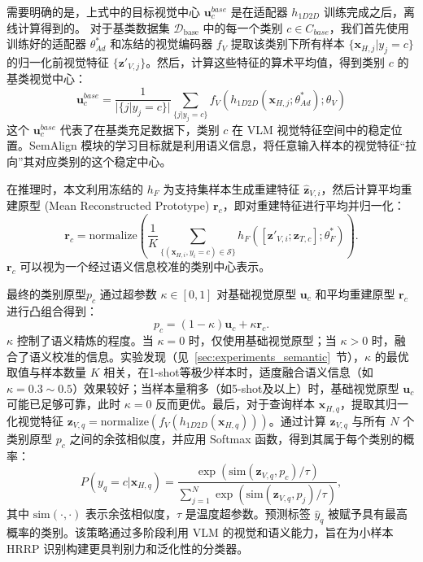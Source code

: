 需要明确的是，上式中的目标视觉中心 $\mathbf{u}_c^{base}$ 是在适配器 $h_{1D2D}$ 训练完成之后，离线计算得到的。 对于基类数据集 $\mathcal{D}_{\text{base}}$ 中的每一个类别 $c \in C_{base}$，我们首先使用训练好的适配器 $\theta_{Ad}^*$ 和冻结的视觉编码器 $f_V$ 提取该类别下所有样本 $\{\mathbf{x}_{H,j} | y_j=c\}$ 的归一化前视觉特征 $\{\mathbf{z}'_{V,j}\}$。然后，计算这些特征的算术平均值，得到类别 $c$ 的基类视觉中心：
\begin{equation}
    \mathbf{u}_c^{base} = \frac{1}{|\{j | y_j=c\}|} \sum_{\{j | y_j=c\}} f_V(h_{1D2D}(\mathbf{x}_{H,j}; \theta_{Ad}^*); \theta_V)
    \label{eq:base_class_center}
\end{equation}
这个 $\mathbf{u}_c^{base}$ 代表了在基类充足数据下，类别 $c$ 在 VLM 视觉特征空间中的稳定位置。SemAlign 模块的学习目标就是利用语义信息，将任意输入样本的视觉特征“拉向”其对应类别的这个稳定中心。

在推理时，本文利用冻结的 $h_F$ 为支持集样本生成重建特征 $\hat{\mathbf{z}}_{V,i}$，然后计算平均重建原型 (Mean Reconstructed Prototype) $\mathbf{r}_c$，即对重建特征进行平均并归一化：
\begin{equation} \mathbf{r}_c = \text{normalize} \left( \frac{1}{K} \sum_{\{(\mathbf{x}_{H,i}, y_i=c) \in \mathcal{S}\}} h_F([\mathbf{z}'_{V,i}; \mathbf{z}_{T,c}]; \theta_F^*) \right). \label{eq:reconstructed_prototype} \end{equation}
$\mathbf{r}_c$ 可以视为一个经过语义信息校准的类别中心表示。

最终的类别原型$p_c$ 通过超参数 $\kappa \in [0, 1]$ 对基础视觉原型 $\mathbf{u}_c$ 和平均重建原型 $\mathbf{r}_c$ 进行凸组合得到：
\begin{equation} p_c = (1 - \kappa) \mathbf{u}_c + \kappa \mathbf{r}_c. \label{eq:semantic_fusion_prototype} \end{equation}
$\kappa$ 控制了语义精炼的程度。当 $\kappa=0$ 时，仅使用基础视觉原型；当 $\kappa>0$ 时，融合了语义校准的信息。实验发现（见~\ref{sec:experiments_semantic}~节），$\kappa$ 的最优取值与样本数量 $K$ 相关，在1-shot等极少样本时，适度融合语义信息（如 $\kappa=0.3 \sim 0.5$）效果较好；当样本量稍多（如5-shot及以上）时，基础视觉原型 $\mathbf{u}_c$ 可能已足够可靠，此时 $\kappa=0$ 反而更优。最后，对于查询样本 $\mathbf{x}_{H,q}$，提取其归一化视觉特征 $\mathbf{z}_{V,q} = \text{normalize}(f_V(h_{1D2D}(\mathbf{x}_{H,q})))$。通过计算 $\mathbf{z}_{V,q}$ 与所有 $N$ 个类别原型 $p_c$ 之间的余弦相似度，并应用 Softmax 函数，得到其属于每个类别的概率：
\begin{equation} P(y_q = c | \mathbf{x}_{H,q}) = \frac{\exp(\text{sim}(\mathbf{z}_{V,q}, p_c) / \tau)}{\sum_{j=1}^{N} \exp(\text{sim}(\mathbf{z}_{V,q}, p_j) / \tau)}, \label{eq:classification_semantic} \end{equation}
其中 $\text{sim}(\cdot, \cdot)$ 表示余弦相似度，$\tau$ 是温度超参数。预测标签 $\hat{y}_q$ 被赋予具有最高概率的类别。该策略通过多阶段利用 VLM 的视觉和语义能力，旨在为小样本 HRRP 识别构建更具判别力和泛化性的分类器。


